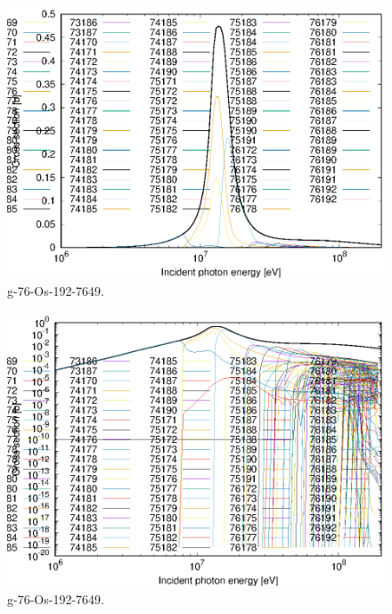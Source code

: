 \begin{figure}
 \includegraphics[width=\linewidth]{eps/g_76-Os-192_7649.eps}
  \caption{g-76-Os-192-7649.}
\end{figure}
\begin{figure}
 \includegraphics[width=\linewidth]{eps-log/g_76-Os-192_7649.eps}
 \caption{g-76-Os-192-7649.}
\end{figure}
\newpage \clearpage

